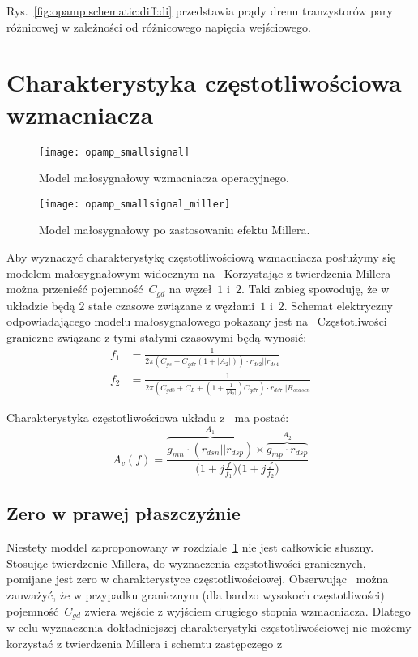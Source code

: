 \documentclass[twoside,pl,final]{labman}
\begin{document}
Rys.~\ref{fig:opamp:schematic:diff:di} przedstawia prądy drenu tranzystorów pary różnicowej w zależności od różnicowego napięcia wejściowego.

\section{Charakterystyka częstotliwościowa wzmacniacza}
\label{opamp:freq}
\begin{figure}[!htbp]
  \centering
  \texttt{[image: opamp\_smallsignal]}
  \caption{Model małosygnałowy wzmacniacza operacyjnego.}
  \label{fig:opamp:freq:smallsignal}
\end{figure}

\begin{figure}[!htbp]
  \centering
  \texttt{[image: opamp\_smallsignal\_miller]}
  \caption{Model małosygnałowy po zastosowaniu efektu Millera.}
  \label{fig:opamp:freq:smallsignal:miller}
\end{figure}

Aby wyznaczyć charakterystykę częstotliwościową wzmacniacza posłużymy się modelem małosygnałowym widocznym na~
Korzystając z twierdzenia Millera można przenieść pojemność~$C_{gd}$ na węzeł~$1$ i~$2$.
Taki zabieg spowoduję, że w układzie będą 2 stałe czasowe związane z węzłami~$1$ i~$2$.
Schemat elektryczny odpowiadającego modelu małosygnałowego pokazany jest na~
Częstotliwości graniczne związane z tymi stałymi czasowymi będą wynosić:
\begin{align}
  f_1 &= \frac{1}{2 \pi (C_{gs} + C_{gd7}(1 + |A_2|)) \cdot r_{ds2} || r_{ds4}} \label{eqn:opamp:freq:pole:low} \\
  f_2 &= \frac{1}{2 \pi (C_{gd8} + C_L + (1 + \frac{1}{|A_2|})C_{gd7}) \cdot r_{ds7} || R_{ocascn}} \label{eqn:opamp:freq:pole:high}
\end{align}

Charakterystyka częstotliwościowa układu z~ ma postać:
\begin{equation}
  A_v(f) = \frac{\overbrace{g_{mn} \cdot (r_{dsn} || r_{dsp})}^{A_1} \times \overbrace{g_{mp} \cdot r_{dsp}}^{A_2}}{\Big(1 + j \frac{f}{f_1}\Big)\Big(1 + j \frac{f}{f_2}\Big)}
\end{equation}

\subsection{Zero w prawej płaszczyźnie}
\label{opamp:freq:rhp}
Niestety moddel zaproponowany w rozdziale~\ref{opamp:freq} nie jest całkowicie słuszny.
Stosując twierdzenie Millera, do wyznaczenia częstotliwości granicznych, pomijane jest zero w charakterystyce częstotliwościowej.
Obserwując~ można zauważyć,
że w przypadku granicznym (dla bardzo wysokoch częstotliwości) pojemność~$C_{gd}$ zwiera wejście z wyjściem drugiego stopnia wzmacniacza.
Dlatego w celu wyznaczenia dokładniejszej charakterystyki częstotliwościowej nie możemy korzystać z twierdzenia Millera i schemtu zastępczego z~
\end{document}
